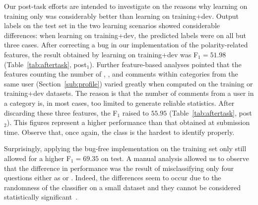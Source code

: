 Our post-task efforts are intended to investigate on the reasons why learning on 
training only was considerably better than learning on training+dev. Output 
labels on the test set in the two learning scenarios showed considerable 
differences: when learning on training+dev, the predicted labels were \yes on 
all but three cases. After correcting a bug in our implementation of the 
polarity-related features, the result obtained by learning on training+dev was 
F$_1=51.98$ (Table~\ref{tab:aftertask}, post$_1$). Further feature-based 
analyses pointed that the features counting the number of \good, \bad, and \pot 
comments within categories from the same user (\cf Section~\ref{sub:profile}) 
varied greatly when computed on the training or training+dev datasets. The 
reason is that the number of comments from a user in a category is, in most 
cases, too limited to generate reliable statistics. After discarding these three 
features, the F$_1$ raised to $55.95$ (Table~\ref{tab:aftertask}, post$_2$). 
This figures represent a higher performance than that obtained at submission 
time. Observe that, once again, the \unsure class is the hardest to identify 
properly.

Surprisingly, applying the bug-free implementation on the training set only 
still allowed for a higher F$_1 =69.35$ on test. A manual analysis allowed us 
to observe that the difference in performance was the result of misclassifying 
only four questions either as \yes or \unsure. Indeed, the differences seem to 
occur due to the randomness of the classifier on a small dataset and they 
cannot be considered statistically 
significant~\cite{Marquez-EtAl:2015:SemEval}. 

